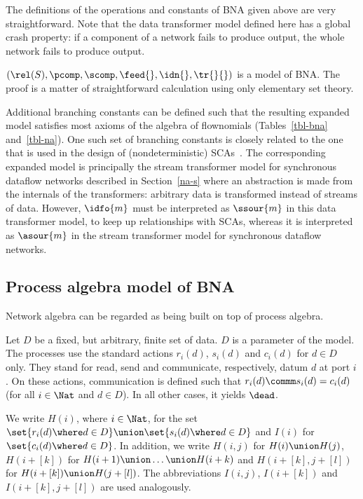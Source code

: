 \documentclass[fleqn]{llncs}
\begin{document}
The definitions of the operations and constants of BNA given above are 
very straightforward.
Note that the data transformer model defined here has a global crash 
property: if a component of a network fails to produce output, the whole 
network fails to produce output.

\bthm
\label{thm-rel}
$(\rel(S),\pcomp,\scomp,\feed{},\idn{},\tr{}{})$ is a model of BNA.
\ethm
\bproof
The proof is a matter of straightforward calculation using only
elementary set theory.
\eproof

Additional branching constants can be defined such that the resulting
expanded model satisfies most axioms of the algebra of flownomials
(Tables~\ref{tbl-bna} and~\ref{tbl-na}).
One such set of branching constants is closely related to the one that
is used in the design of (nondeterministic) SCAs~\cite{TT91}.
The corresponding expanded model is principally the stream transformer
model for synchronous dataflow networks described in Section~\ref{na-s}
where an abstraction is made from the internals of the transformers:
arbitrary data is transformed instead of streams of data.
However, $\idfo{m}$ must be interpreted as $\ssour{m}$ in this data
transformer model, to keep up relationships with SCAs, whereas it is
interpreted as $\asour{m}$ in the stream transformer model for
synchronous dataflow networks.

\subsection{Process algebra model of BNA}
\label{bna-proc}
Network algebra can be regarded as being built on top of process
algebra.

Let $D$ be a fixed, but arbitrary, finite set of data.
$D$ is a parameter of the model.
The processes use the standard actions $r_i(d)$, $s_i(d)$ and
$c_i(d)$ for $d \in D$ only.
They stand for read, send and communicate, respectively, datum $d$ at
port $i$.
On these actions, communication is defined such that
$r_i(d) \commm s_i(d) = c_i(d)$\linebreak[2] (for all $i \in \Nat$ and $d \in D$).
In all other cases, it yields $\dead$.

We write $H(i)$, where $i \in \Nat$, for the set
$\set{r_i(d) \where d \in D} \union \set{s_i(d) \where d \in D}$
and $I(i)$ for $\set{c_i(d) \where d \in D}$.
In addition, we write
$H(i,j)$ for $H(i) \union H(j)$,
$H(i + [k])$ for $H(i + 1) \union \dots \union H(i + k)$ and
$H(i + [k],j + [l])$ for $H(i + [k]) \union H(j + [l])$.
The abbreviations $I(i,j)$, $I(i + [k])$ and $I(i + [k],j + [l])$ are
used analogously.
\end{document}
